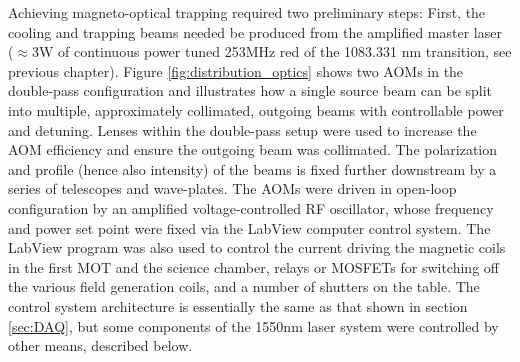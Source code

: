 	Achieving magneto-optical trapping required two preliminary steps: First, the cooling and trapping beams needed be produced from the amplified master laser ($\approx$3W of continuous power tuned 253MHz red of the 1083.331 nm transition, see previous chapter).
	Figure \ref{fig:distribution_optics} shows two AOMs in the double-pass configuration and illustrates how a single source beam can be split into multiple, approximately collimated, outgoing beams with controllable power and detuning.
	Lenses within the double-pass setup were used to increase the AOM efficiency and ensure the outgoing beam was collimated.
	The polarization and profile (hence also intensity) of the beams is fixed further downstream by a series of telescopes and wave-plates.
	The AOMs were driven in open-loop configuration by an amplified voltage-controlled RF oscillator, whose frequency and power set point were fixed via the LabView computer control system.
	The LabView program was also used to control the current driving the magnetic coils in the first MOT and the science chamber, relays or MOSFETs for switching off the various field generation coils, and a number of shutters on the table.
	The control system architecture is essentially the same as that shown in section \ref{sec:DAQ}, but some components of the 1550nm laser system were controlled by other means, described below.
	
